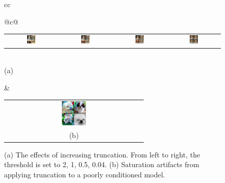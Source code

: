 \documentclass{article} %
\makeatletter
\newcommand{\subf}[2]{%
  {\small\begin{tabular}[b]{@{}c@{}}
  #1\\#2
  \end{tabular}}%
}
\makeatother
\begin{document}
\begin{figure}[tbp]
  \centering
  \begin{tabular}{cc}
  \subf{
  \setlength{\tabcolsep}{1pt}
  \begin{tabular}{cccc}
  \includegraphics[width=0.18\textwidth]{images/trunc_figure2/Truncfigure1full5.jpg} & 
\includegraphics[width=0.18\textwidth]{images/trunc_figure2/Truncfigure1full3.jpg} &
\includegraphics[width=0.18\textwidth]{images/trunc_figure2/Truncfigure1full2.jpg} & 
\includegraphics[width=0.18\textwidth]{images/trunc_figure2/Truncfigure1full1.jpg}
 

 
\end{tabular}
}{(a)}

&
 \subf{\includegraphics[width=0.18\textwidth]{images/rainbowdogs0.jpg}}{(b)}
  
 \end{tabular}
\caption{(a) The effects of increasing truncation. From left to right, the threshold is set to 2, 1, 0.5, 0.04. (b) Saturation artifacts from applying truncation to a poorly conditioned model.}

\label{trunc_figure}
\end{figure}
\end{document}
